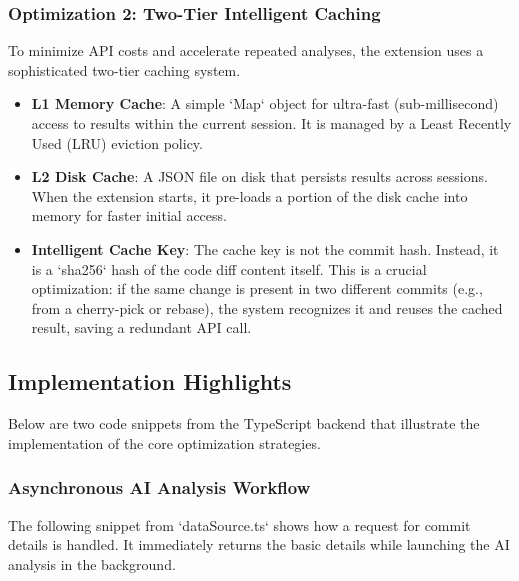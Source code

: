 \subsubsection{Optimization 2: Two-Tier Intelligent Caching}
To minimize API costs and accelerate repeated analyses, the extension uses a sophisticated two-tier caching system.
\begin{itemize}
    \item \textbf{L1 Memory Cache}: A simple `Map` object for ultra-fast (sub-millisecond) access to results within the current session. It is managed by a Least Recently Used (LRU) eviction policy.
    \item \textbf{L2 Disk Cache}: A JSON file on disk that persists results across sessions. When the extension starts, it pre-loads a portion of the disk cache into memory for faster initial access.
    \item \textbf{Intelligent Cache Key}: The cache key is not the commit hash. Instead, it is a `sha256` hash of the code diff content itself. This is a crucial optimization: if the same change is present in two different commits (e.g., from a cherry-pick or rebase), the system recognizes it and reuses the cached result, saving a redundant API call.
\end{itemize}

\subsection{Implementation Highlights}
Below are two code snippets from the TypeScript backend that illustrate the implementation of the core optimization strategies.

\subsubsection{Asynchronous AI Analysis Workflow}
The following snippet from `dataSource.ts` shows how a request for commit details is handled. It immediately returns the basic details while launching the AI analysis in the background.

